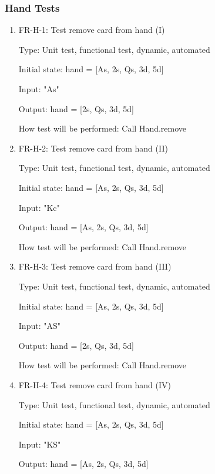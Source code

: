 \documentclass[12pt, titlepage]{article}
\begin{document}
\subsubsection{Hand Tests}
\begin{enumerate}
    \item{FR-H-1: Test remove card from hand (I)\\}
    
    Type: Unit test, functional test, dynamic, automated 
    					
    Initial state: hand = [As, 2s, Qs, 3d, 5d]
    
    Input: "As"
    
    Output: hand = [2s, Qs, 3d, 5d]
    
    How test will be performed: Call Hand.remove 
    
    \item{FR-H-2: Test remove card from hand (II)\\}
    
    Type: Unit test, functional test, dynamic, automated 
    					
    Initial state: hand = [As, 2s, Qs, 3d, 5d]
    
    Input: "Kc"
    
    Output: hand = [As, 2s, Qs, 3d, 5d]
    
    How test will be performed: Call Hand.remove
    
    \item{FR-H-3: Test remove card from hand (III)\\}
    
    Type: Unit test, functional test, dynamic, automated 
    					
    Initial state: hand = [As, 2s, Qs, 3d, 5d]
    
    Input: "AS"
    
    Output: hand = [2s, Qs, 3d, 5d]
    
    How test will be performed: Call Hand.remove
    
    \item{FR-H-4: Test remove card from hand (IV)\\}
    
    Type: Unit test, functional test, dynamic, automated
    
    Initial state: hand = [As, 2s, Qs, 3d, 5d]
    
    Input: "KS"
    
    Output: hand = [As, 2s, Qs, 3d, 5d]
    

\end{enumerate}
\end{document}
